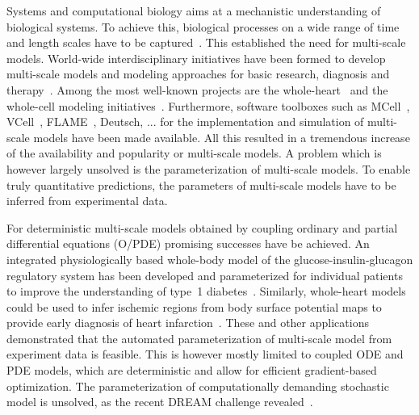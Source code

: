 \documentclass[10pt,letterpaper]{article}
\newcommand{\jh}[1]{{\color{red}#1}}
\begin{document}
Systems and computational biology aims at a mechanistic understanding of biological systems. To achieve this, biological processes on a wide range of time and length scales have to be captured~\cite{HunterBor2003}. This established the need for multi-scale models. World-wide interdisciplinary initiatives have been formed to develop multi-scale models and modeling approaches for basic research, diagnosis and therapy~\cite{PhysiomeProject}. Among the most well-known projects are the whole-heart~\cite{HunterBor2003,Nobel2002,Trayanova2011} and the whole-cell modeling initiatives~\cite{TomitaHas1999,KarrSan2012}. Furthermore, software toolboxes such as MCell~\cite{StilesBar2001}, VCell~\cite{SchaffFin1997}, FLAME~\cite{}, Deutsch, ... for the implementation and simulation of multi-scale models have been made available. All this resulted in a tremendous increase of the availability and popularity or multi-scale models. A problem which is however largely unsolved is the parameterization of multi-scale models. To enable truly quantitative predictions, the parameters of multi-scale models have to be inferred from experimental data.

For deterministic multi-scale models obtained by coupling ordinary and partial differential equations (O/PDE) promising successes have be achieved. An integrated physiologically based whole-body model of the glucose-insulin-glucagon regulatory system has been developed and parameterized for individual patients to improve the understanding of type~1 diabetes~\cite{SchallerWil2013}. Similarly, whole-heart models could be used to infer ischemic regions from body surface potential maps to provide early diagnosis of heart infarction~\cite{NielsenLys2013}. These and other applications demonstrated that the automated parameterization of multi-scale model from experiment data is feasible. This is however mostly limited to coupled ODE and PDE models, which are deterministic and allow for efficient gradient-based optimization. The parameterization of computationally demanding stochastic model is unsolved\jh{, as the recent DREAM challenge revealed~\cite{}.}
\end{document}
